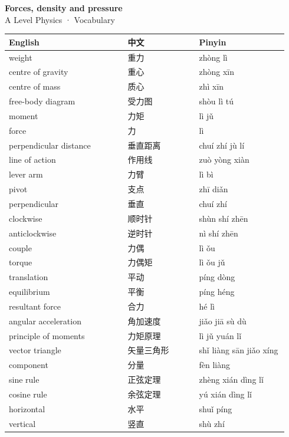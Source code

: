 \documentclass[11pt]{article}
\begin{document}
\begin{center}
  {\LARGE\bfseries Forces, density and pressure}\\[0.35em]
  {\large A Level Physics · Vocabulary}
\end{center}
\vspace{0.6em}

\begin{longtable}{@{}p{0.40\linewidth}p{0.24\linewidth}p{0.30\linewidth}@{}}
\toprule
\textbf{English} & \textbf{中文} & \textbf{Pinyin} \\
\midrule
\endhead
\bottomrule
\endlastfoot
weight & 重力 & zhòng lì \\
centre of gravity & 重心 & zhòng xīn \\
centre of mass & 质心 & zhì xīn \\
free-body diagram & 受力图 & shòu lì tú \\
moment & 力矩 & lì jǔ \\
force & 力 & lì \\
perpendicular distance & 垂直距离 & chuí zhí jù lí \\
line of action & 作用线 & zuò yòng xiàn \\
lever arm & 力臂 & lì bì \\
pivot & 支点 & zhī diǎn \\
perpendicular & 垂直 & chuí zhí \\
clockwise & 顺时针 & shùn shí zhēn \\
anticlockwise & 逆时针 & nì shí zhēn \\
couple & 力偶 & lì ǒu \\
torque & 力偶矩 & lì ǒu jǔ \\
translation & 平动 & píng dòng \\
equilibrium & 平衡 & píng héng \\
resultant force & 合力 & hé lì \\
angular acceleration & 角加速度 & jiǎo jiā sù dù \\
principle of moments & 力矩原理 & lì jǔ yuán lǐ \\
vector triangle & 矢量三角形 & shǐ liàng sān jiǎo xíng \\
component & 分量 & fèn liàng \\
sine rule & 正弦定理 & zhèng xián dìng lǐ \\
cosine rule & 余弦定理 & yú xián dìng lǐ \\
horizontal & 水平 & shuǐ píng \\
vertical & 竖直 & shù zhí \\

\end{longtable}
\end{document}

